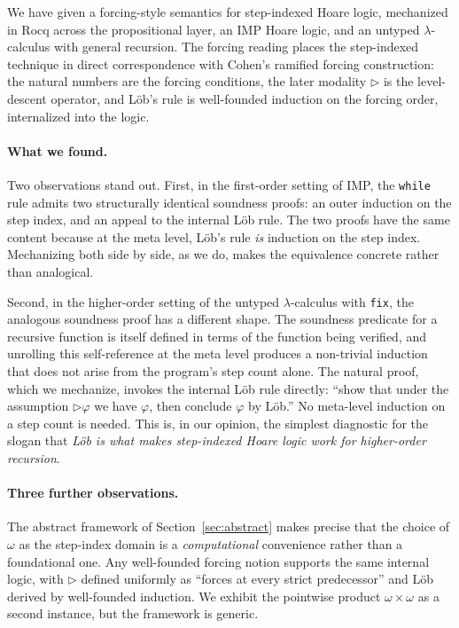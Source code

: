 \documentclass[11pt]{article}
\begin{document}
We have given a forcing-style semantics for step-indexed Hoare
logic, mechanized in Rocq across the propositional layer, an IMP
Hoare logic, and an untyped $\lambda$-calculus with general
recursion. The forcing reading places the step-indexed technique
in direct correspondence with Cohen's ramified forcing construction:
the natural numbers are the forcing conditions, the later modality
$\triangleright$ is the level-descent operator, and Löb's rule is
well-founded induction on the forcing order, internalized into the
logic.

\paragraph{What we found.}
Two observations stand out. First, in the first-order setting of
IMP, the \texttt{while} rule admits two structurally identical
soundness proofs: an outer induction on the step index, and an
appeal to the internal Löb rule. The two proofs have the same
content because at the meta level, Löb's rule \emph{is} induction
on the step index. Mechanizing both side by side, as we do, makes
the equivalence concrete rather than analogical.

Second, in the higher-order setting of the untyped $\lambda$-calculus
with \texttt{fix}, the analogous soundness proof has a different
shape. The soundness predicate for a recursive function is itself
defined in terms of the function being verified, and unrolling this
self-reference at the meta level produces a non-trivial induction
that does not arise from the program's step count alone. The natural
proof, which we mechanize, invokes the internal Löb rule directly:
``show that under the assumption $\triangleright \varphi$ we have
$\varphi$, then conclude $\varphi$ by Löb.'' No meta-level induction
on a step count is needed. This is, in our opinion, the simplest
diagnostic for the slogan that \emph{Löb is what makes step-indexed
Hoare logic work for higher-order recursion}.

\paragraph{Three further observations.}
The abstract framework of Section~\ref{sec:abstract} makes precise
that the choice of $\omega$ as the step-index domain is a
\emph{computational} convenience rather than a foundational one. Any
well-founded forcing notion supports the same internal logic, with
$\triangleright$ defined uniformly as ``forces at every strict
predecessor'' and Löb derived by well-founded induction. We exhibit
the pointwise product $\omega \times \omega$ as a second instance, but
the framework is generic.
\end{document}
